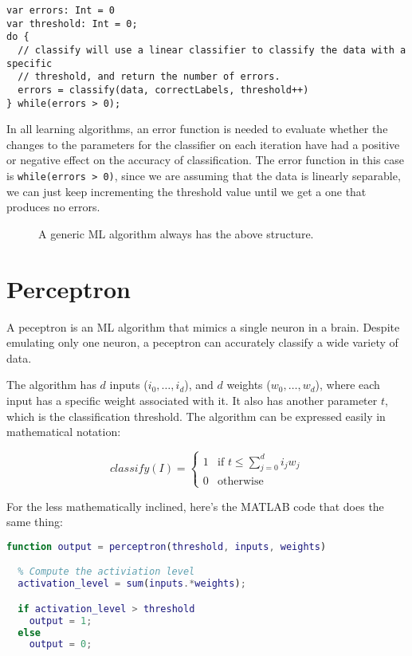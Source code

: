 \begin{lstlisting}[label=linearClassifierLearningAlgorithm, caption=Linear classifier learning algorithm]
var errors: Int = 0
var threshold: Int = 0;
do {
  // classify will use a linear classifier to classify the data with a specific
  // threshold, and return the number of errors.
  errors = classify(data, correctLabels, threshold++)
} while(errors > 0);
\end{lstlisting}

In all learning algorithms, an error function is needed to evaluate whether the
changes to the parameters for the classifier on each iteration have had a
positive or negative effect on the accuracy of classification. The error
function in this case is \texttt{while(errors > 0)}, since we are assuming that
the data is linearly separable, we can just keep incrementing the threshold
value until we get a one that produces no errors.

\begin{figure}[!h]
  
  \caption{A generic ML algorithm always has the above structure.}
  \label{fig:generic-ML-algorithm}
\end{figure}

\section{Perceptron}

A peceptron is an ML algorithm that mimics a single neuron in a brain. Despite
emulating only one neuron, a peceptron can accurately classify a wide variety of
data.

The algorithm has $d$ inputs ($i_0, \dots, i_d$), and $d$ weights ($w_0, \dots,
w_d$), where each input has a specific weight associated with it. It also has
another parameter $t$, which is the classification threshold. The algorithm can
be expressed easily in mathematical notation:

\[
  classify(I) = 
  \begin{cases}
    1 & \text{if } t \leq \sum\limits^d_{j=0}i_jw_j\\
    0 & \text{otherwise}
  \end{cases}
\]

For the less mathematically inclined, here's the MATLAB code that does the same
thing:

\begin{lstlisting}[language=matlab, label=perceptron,
                   caption=A perceptron implementation in MATLAB]
  function output = perceptron(threshold, inputs, weights)

  % Compute the activiation level
  activation_level = sum(inputs.*weights);

  if activation_level > threshold
    output = 1;
  else
    output = 0;
\end{lstlisting}

